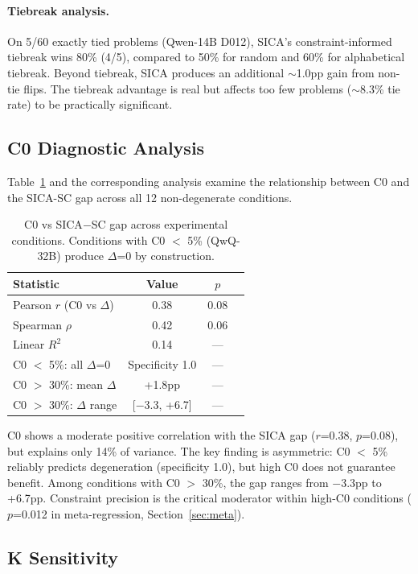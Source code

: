\documentclass[11pt,a4paper]{article}
\begin{document}
\paragraph{Tiebreak analysis.} On 5/60 exactly tied problems (Qwen-14B D012), SICA's constraint-informed tiebreak wins 80\% (4/5), compared to 50\% for random and 60\% for alphabetical tiebreak. Beyond tiebreak, SICA produces an additional $\sim$1.0pp gain from non-tie flips. The tiebreak advantage is real but affects too few problems ($\sim$8.3\% tie rate) to be practically significant.

\subsection{C0 Diagnostic Analysis}

Table~\ref{tab:c0} and the corresponding analysis examine the relationship between C0 and the SICA-SC gap across all 12 non-degenerate conditions.

\begin{table}[t]
\centering
\caption{C0 vs SICA$-$SC gap across experimental conditions. Conditions with C0 $<$ 5\% (QwQ-32B) produce $\Delta$=0 by construction.}
\label{tab:c0}
\small
\begin{tabular}{lccc}
\toprule
\textbf{Statistic} & \textbf{Value} & \textbf{$p$} \\
\midrule
Pearson $r$ (C0 vs $\Delta$) & 0.38 & 0.08 \\
Spearman $\rho$ & 0.42 & 0.06 \\
Linear $R^2$ & 0.14 & --- \\
C0 $<$ 5\%: all $\Delta$=0 & Specificity 1.0 & --- \\
C0 $>$ 30\%: mean $\Delta$ & +1.8pp & --- \\
C0 $>$ 30\%: $\Delta$ range & [$-$3.3, +6.7] & --- \\
\bottomrule
\end{tabular}
\end{table}

C0 shows a moderate positive correlation with the SICA gap ($r$=0.38, $p$=0.08), but explains only 14\% of variance. The key finding is asymmetric: C0 $<$ 5\% reliably predicts degeneration (specificity 1.0), but high C0 does not guarantee benefit. Among conditions with C0 $>$ 30\%, the gap ranges from $-$3.3pp to +6.7pp. Constraint precision is the critical moderator within high-C0 conditions ($p$=0.012 in meta-regression, Section~\ref{sec:meta}).

\subsection{K Sensitivity}
\label{sec:k_ablation}
\end{document}
